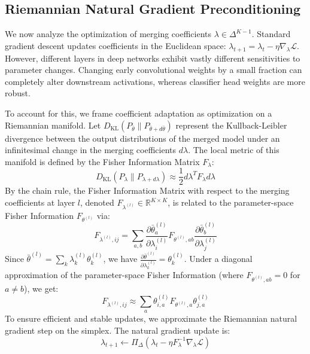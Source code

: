 \documentclass{article}
\begin{document}
\subsection{Riemannian Natural Gradient Preconditioning}
We now analyze the optimization of merging coefficients $\lambda \in \Delta^{K-1}$. Standard gradient descent updates coefficients in the Euclidean space: $\lambda_{t+1} = \lambda_t - \eta \nabla_\lambda \mathcal{L}$. However, different layers in deep networks exhibit vastly different sensitivities to parameter changes. Changing early convolutional weights by a small fraction can completely alter downstream activations, whereas classifier head weights are more robust.

To account for this, we frame coefficient adaptation as optimization on a Riemannian manifold. Let $D_{\text{KL}}(P_{\bar{\theta}} \| P_{\bar{\theta} + d\bar{\theta}})$ represent the Kullback-Leibler divergence between the output distributions of the merged model under an infinitesimal change in the merging coefficients $d\lambda$. The local metric of this manifold is defined by the Fisher Information Matrix $F_\lambda$:
\begin{equation}
D_{\text{KL}}(P_{\lambda} \| P_{\lambda + d\lambda}) \approx \frac{1}{2} d\lambda^T F_\lambda d\lambda
\end{equation}
By the chain rule, the Fisher Information Matrix with respect to the merging coefficients at layer $l$, denoted $F_{\lambda^{(l)}} \in \mathbb{R}^{K \times K}$, is related to the parameter-space Fisher Information $F_{\theta^{(l)}}$ via:
\begin{equation}
F_{\lambda^{(l)}, i j} = \sum_{a, b} \frac{\partial \bar{\theta}^{(l)}_a}{\partial \lambda^{(l)}_i} F_{\theta^{(l)}, a b} \frac{\partial \bar{\theta}^{(l)}_b}{\partial \lambda^{(l)}_j}
\end{equation}
Since $\bar{\theta}^{(l)} = \sum_k \lambda^{(l)}_k \theta^{(l)}_k$, we have $\frac{\partial \bar{\theta}^{(l)}}{\partial \lambda^{(l)}_k} = \theta^{(l)}_k$. Under a diagonal approximation of the parameter-space Fisher Information (where $F_{\theta^{(l)}, ab} = 0$ for $a \neq b$), we get:
\begin{equation}
F_{\lambda^{(l)}, i j} \approx \sum_{a} \theta^{(l)}_{i, a} F_{\theta^{(l)}, a} \theta^{(l)}_{j, a}
\end{equation}
To ensure efficient and stable updates, we approximate the Riemannian natural gradient step on the simplex. The natural gradient update is:
\begin{equation}
\lambda_{t+1} \leftarrow \Pi_\Delta \left( \lambda_t - \eta F_{\lambda}^{-1} \nabla_\lambda \mathcal{L} \right)
\end{equation}
\end{document}
